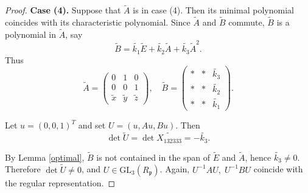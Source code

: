 \documentclass[10pt,a4paper]{amsart}
\begin{document}
\begin{proof}
\textbf{Case (4).} Suppose that $\widetilde{A}$ is in case (4). Then its minimal polynomial coincides with its characteristic polynomial. Since $\widetilde{A}$ and $\widetilde{B}$ commute, $\widetilde{B}$ is a polynomial in $\widetilde{A}$, say
$$
\widetilde{B}=\widetilde{k_1}\widetilde{E}+\widetilde{k_2}\widetilde{A}+\widetilde{k_3}\widetilde{A}^2.
$$
Thus
$$
\widetilde{A}=\begin{pmatrix}
0 & 1 & 0 \\
0 & 0 & 1 \\
\widetilde{x} & \widetilde{y} & \widetilde{z}
\end{pmatrix},
\quad
\widetilde{B}=\begin{pmatrix}
* & * & \widetilde{k_3} \\
* & * & \widetilde{k_2} \\
* & * & \widetilde{k_1}
\end{pmatrix}.
$$

Let $u=(0,0,1)^T$ and set $U=(u,Au,Bu)$. Then
$$
\det \widetilde{U}=\det \widetilde{X_{132333}}=-\widetilde{k_3}.
$$

By Lemma \ref{optimal}, $\widetilde{B}$ is not contained in the span of $\widetilde{E}$ and $\widetilde{A}$, hence $\widetilde{k_3}\ne 0$. Therefore $\det \widetilde{U}\ne 0$, and $U \in \mathrm{GL}_3(R_\mathfrak{p})$. Again, $U^{-1}AU,\; U^{-1}BU$ coincide with the regular representation.
\end{proof}
\end{document}
